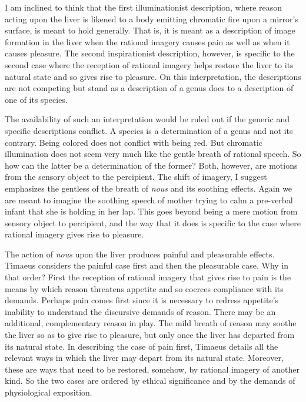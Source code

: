 I am inclined to think that the first illuminationist description, where reason acting upon the liver is likened to a body emitting chromatic fire upon a mirror's surface, is meant to hold generally. That is, it is meant as a description of image formation in the liver when the rational imagery causes pain as well as when it causes pleasure. The second inspirationist description, however, is specific to the second case where the reception of rational imagery helps restore the liver to its natural state and so gives rise to pleasure. On this interpretation, the descriptions are not competing but stand as a description of a genus does to a description of one of its species.

The availability of such an interpretation would be ruled out if the generic and specific descriptions conflict. A species is a determination of a genus and not its contrary. Being colored does not conflict with being red. But chromatic illumination does not seem very much like the gentle breath of rational speech. So how can the latter be a determination of the former? Both, however, are motions from the sensory object to the percipient. The shift of imagery, I suggest emphasizes the gentless of the breath of \emph{nous} and its soothing effects. Again we are meant to imagine the soothing speech of mother trying to calm a pre-verbal infant that she is holding in her lap. This goes beyond being a mere motion from sensory object to percipient, and the way that it does is specific to the case where rational imagery gives rise to pleasure.

The action of \emph{nous} upon the liver produces painful and pleasurable effects. Timaeus considers the painful case first and then the pleasurable case. Why in that order? First the reception of rational imagery that gives rise to pain is the means by which reason threatens appetite and so coerces compliance with its demands. Perhaps pain comes first since it is necessary to redress appetite's inability to understand the discursive demands of reason. There may be an additional, complementary reason in play. The mild breath of reason may soothe the liver so as to give rise to pleasure, but only once the liver has departed from its natural state. In describing the case of pain first, Timaeus details all the relevant ways in which the liver may depart from its natural state. Moreover, these are ways that need to be restored, somehow, by rational imagery of another kind. So the two cases are ordered by ethical significance and by the demands of physiological exposition.

